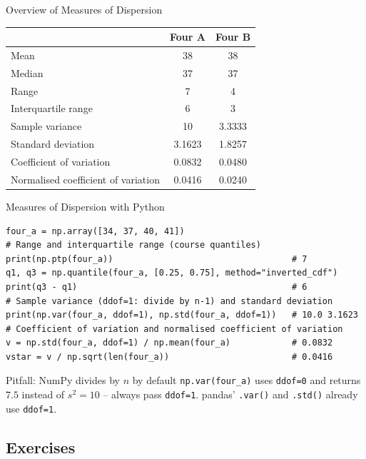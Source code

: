 \documentclass[aspectratio=169,11pt]{beamer}
\begin{document}
\begin{frame}{Overview of Measures of Dispersion}
  \begin{center}
    \normalsize
    \begin{tabular}{lcc}
      \toprule
      & \textbf{Four A} & \textbf{Four B} \\
      \midrule
      Mean & 38 & 38 \\
      Median & 37 & 37 \\
      Range & 7 & 4 \\
      Interquartile range & 6 & 3 \\
      Sample variance & 10 & 3.3333 \\
      Standard deviation & 3.1623 & 1.8257 \\
      Coefficient of variation & 0.0832 & 0.0480 \\
      Normalised coefficient of variation & 0.0416 & 0.0240 \\
      \bottomrule
    \end{tabular}
  \end{center}
\end{frame}

\begin{frame}[fragile]{Measures of Dispersion with Python}
\begin{lstlisting}
four_a = np.array([34, 37, 40, 41])
# Range and interquartile range (course quantiles)
print(np.ptp(four_a))                                   # 7
q1, q3 = np.quantile(four_a, [0.25, 0.75], method="inverted_cdf")
print(q3 - q1)                                          # 6
# Sample variance (ddof=1: divide by n-1) and standard deviation
print(np.var(four_a, ddof=1), np.std(four_a, ddof=1))   # 10.0 3.1623
# Coefficient of variation and normalised coefficient of variation
v = np.std(four_a, ddof=1) / np.mean(four_a)            # 0.0832
vstar = v / np.sqrt(len(four_a))                        # 0.0416
\end{lstlisting}
\begin{alertblock}{Pitfall: NumPy divides by $n$ by default}
  \texttt{np.var(four\_a)} uses \texttt{ddof=0} and returns $7.5$ instead of
  $s^2 = 10$ -- always pass \texttt{ddof=1}. pandas' \texttt{.var()} and
  \texttt{.std()} already use \texttt{ddof=1}.
\end{alertblock}
\end{frame}

\subsection{Exercises}
\end{document}
